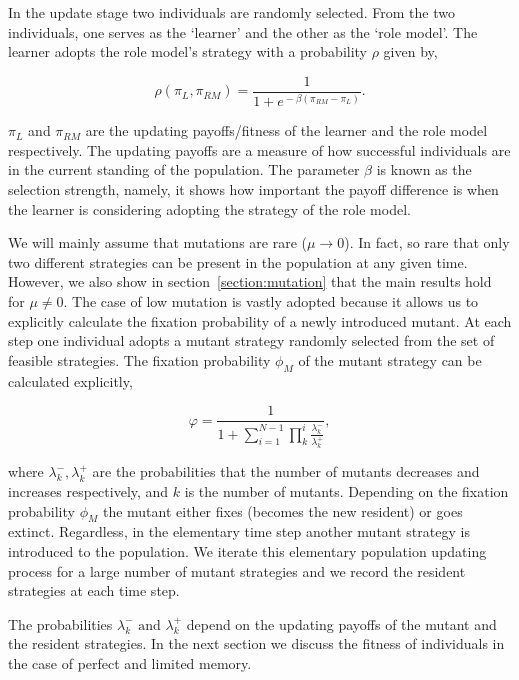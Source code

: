 \documentclass[11pt]{article}
\theoremstyle{plainCl1}
\theoremstyle{plainCl2}
\begin{document}
In the update stage two individuals are randomly selected. From the two
individuals, one  serves as the `learner' and the other as the `role model'. The
learner adopts the role model's strategy with a probability \(\rho\) given by,

\begin{equation} \label{Eq:rho}
    \rho(\pi_{L}, \pi_{RM}) = \frac{1}{1\!+\! e^{\!-\!\beta (\pi_{RM}\!-\! \pi_{L})}}.
\end{equation}

\(\pi_{L}\) and \(\pi_{RM}\) are the updating payoffs/fitness of the learner and the
role model respectively. The updating payoffs are a measure of how successful
individuals are in the current standing of the population. The parameter
\(\beta\) is known as the selection strength, namely, it shows how important the
payoff difference is when the learner is considering adopting the strategy of
the role model.

We will mainly assume that mutations are rare (\(\mu \rightarrow 0\)). In fact,
so rare that only two different strategies can be present in the population at
any given time. However, we also show in section~\ref{section:mutation} that the
main results hold for \(\mu \neq 0\). The case of low mutation is vastly adopted because it allows us to explicitly
calculate the fixation probability of a newly introduced mutant. At each step
one individual adopts a mutant strategy randomly selected from the set of
feasible strategies. The fixation probability \(\phi_{M}\) of the mutant
strategy can be calculated explicitly,

\begin{equation}\label{eq:appendix_fixation_probability}
    \varphi = \frac{1}{1+\sum\limits_{i=1}^{N-1}\prod\limits_k^i \frac{\lambda^-_k}{\lambda^+_k}},
\end{equation}

where \(\lambda^-_k, \lambda^+_k\) are the probabilities that the number of
mutants decreases and increases respectively, and \(k\) is the number of mutants. Depending on the fixation
probability \(\phi_{M}\) the mutant either fixes (becomes the new resident) or
goes extinct. Regardless, in the elementary time step another mutant strategy is
introduced to the population. We iterate this elementary population updating
process for a large number of mutant strategies and we record the resident
strategies at each time step.

The probabilities \(\lambda^-_k \text{ and } \lambda^+_k\) depend on the
updating payoffs of the mutant and the resident strategies. In the next
section we discuss the fitness of individuals in the case of perfect and
limited memory.
\end{document}

